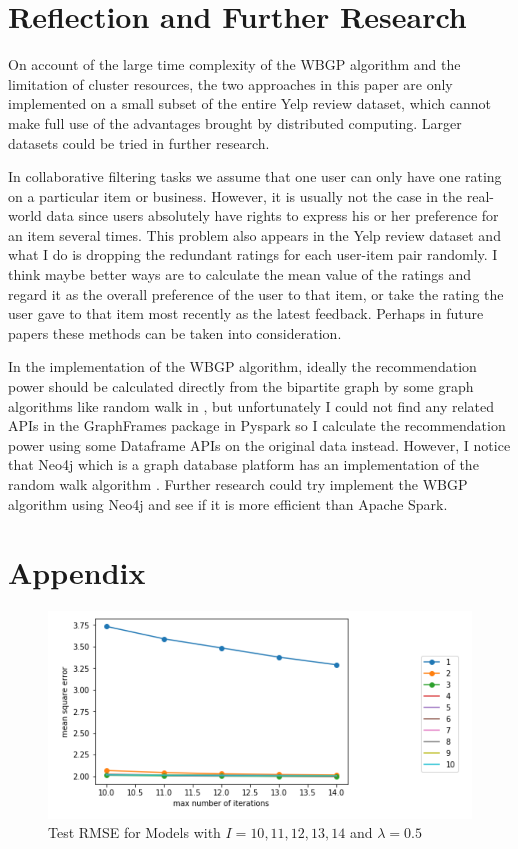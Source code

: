 \documentclass{article}
\begin{document}
\section*{Reflection and Further Research} %

\noindent On account of the large time complexity of the WBGP algorithm and the limitation of cluster 
resources, the two approaches in this paper are only implemented on a small subset of the entire Yelp 
review dataset, which cannot make full use of the advantages brought by distributed computing. Larger 
datasets could be tried in further research.

\indent In collaborative filtering tasks we assume that one user can only have one rating on a particular 
item or business. However, it is usually not the case in the real-world data since users absolutely have 
rights to express his or her preference for an item several times. This problem also appears in the 
Yelp review dataset and what I do is dropping the redundant ratings for each user-item pair randomly. 
I think maybe better ways are to calculate the mean value of the ratings and regard it as the overall 
preference of the user to that item, or take the rating the user gave to that item most recently as 
the latest feedback. Perhaps in future papers these methods can be taken into consideration.

\indent In the implementation of the WBGP algorithm, ideally the recommendation power should be 
calculated directly from the bipartite graph by some graph algorithms like random walk in \cite{sawant2013collaborative}, but 
unfortunately I could not find any related APIs in the GraphFrames package in Pyspark so I calculate 
the recommendation power using some Dataframe APIs on the original data instead. However, I notice that 
Neo4j which is a graph database platform has an implementation of the random walk algorithm \cite{needham2019graph}. Further 
research could try implement the WBGP algorithm using Neo4j and see if it is more efficient than Apache Spark.

\clearpage

   



\section*{Appendix} %

\begin{figure}[H]
	\centering
	\includegraphics[width = .8\textwidth]{figs/figure5.png}
	\caption{Test RMSE for Models with $I=10,11,12,13,14$ and  $\lambda =0.5$} 
	\label{figure5}
\end{figure}
\end{document}
